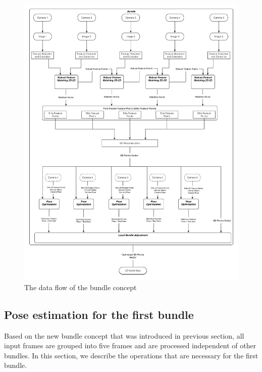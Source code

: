 \begin{figure}[H]
  \centering
  \includegraphics[width=\textwidth, height=\textheight, keepaspectratio]{figures/bundle_concept}
  \caption{The data flow of the bundle concept}\label{fig:bundle_concept}
\end{figure}

\subsection{Pose estimation for the first bundle} \label{subsec:pose_first_bundle}

Based on the new bundle concept that was introduced in previous section, all input frames are grouped into five frames and are processed independent of other bundles. In this section, we describe the operations that are necessary for the first bundle.


